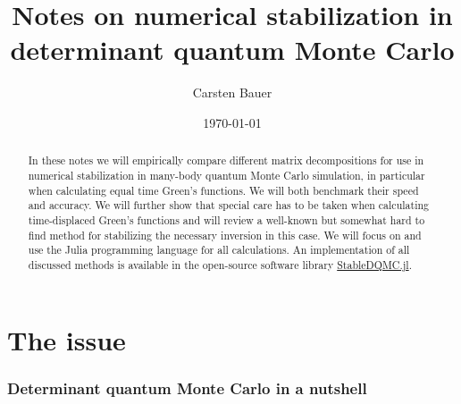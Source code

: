 \documentclass[%
 reprint,
superscriptaddress,
showpacs,
 amsmath,amssymb,
 aps,
 prb,
longbibliography,
]{revtex4-1}
\begin{document}
\title{Notes on numerical stabilization in determinant quantum Monte Carlo}%

\author{Carsten Bauer}

\date{\today}%

\begin{abstract}
In these notes we will empirically compare different matrix decompositions for use in numerical stabilization in many-body quantum Monte Carlo simulation, in particular when calculating equal time Green's functions. We will both benchmark their speed and accuracy. We will further show that special care has to be taken when calculating time-displaced Green's functions and will review a well-known but somewhat hard to find method for stabilizing the necessary inversion in this case. We will focus on and use the Julia programming language for all calculations. An implementation of all discussed methods is available in the open-source software library \href{http://github.com/crstnbr/StableDQMC.jl}{StableDQMC.jl}.
\end{abstract}


\maketitle


\section{\label{sec:why}The issue}

\subsubsection{Determinant quantum Monte Carlo in a nutshell}
\end{document}
